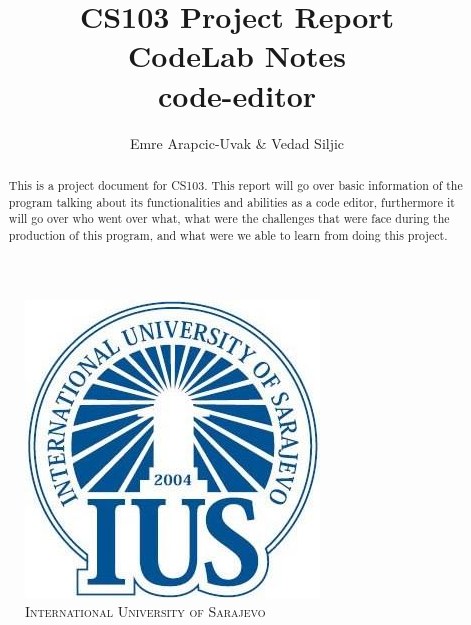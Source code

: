 \documentclass[a4paper, 11pt]{article}
\title{CS103 Project Report \\ CodeLab Notes \\ \small{code-editor}}
\author{Emre Arapcic-Uvak & Vedad Siljic}
\date{}
\begin{document}
	\begin{figure}
		\centering
		\includegraphics[scale = 0.5]{IUS_Logo}
		\\ \vspace{5mm}
		\noindent \large{\textsc{International University of Sarajevo}}
	\end{figure}
	\maketitle
	\vspace{5mm}

	\begin{abstract}
		\noindent This is a project document for CS103. This report will go over basic information of the program talking about its functionalities and abilities as a code editor, furthermore it will go over who went over what, what were the challenges that were face during the production of this program, and what were we able to learn from doing this project.
	\end{abstract}
	\pagebreak
	
	\tableofcontents
	\pagebreak
	
\end{document}
